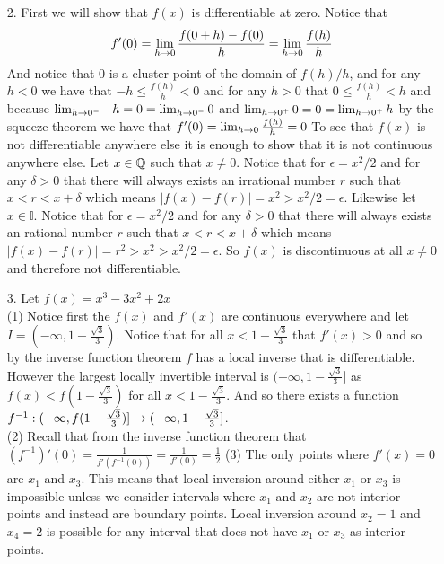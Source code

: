 \documentclass[12pt]{amsart}
\begin{document}
\begin{itemize}
   \item[2.] First we will show that $f(x)$ is differentiable at zero. Notice that
      \[f'(0)=\lim_{h\rightarrow 0}\frac{f(0+h)-f(0)}{h}=\lim_{h\rightarrow 0}\frac{f(h)}{h}\]
      And notice that $0$ is a cluster point of the domain of $f(h)/h$, and for any
      $h<0$ we have that $-h\leq \frac{f(h)}{h}<0$ and for any $h>0$ that $0\leq
         \frac{f(h)}{h}<h$ and because $\lim_{h\rightarrow 0^-}-h=0=\lim_{h\rightarrow 0^-}0$ and
      $\lim_{h\rightarrow 0^+}0=0=\lim_{h\rightarrow 0^+}h$ by the squeeze theorem we have that
      \(f'(0)=\lim_{h\rightarrow 0}\frac{f(h)}{h}=0\) To see that $f(x)$ is not
      differentiable anywhere else it is enough to show that it is not continuous
      anywhere else. Let $x\in \mathbb{Q}$ such that $x\neq 0$. Notice that for
      $\epsilon=x^2/2$ and for any $\delta>0$ that there will always exists an
      irrational number $r$ such that $x<r<x+\delta$ which means
      $|f(x)-f(r)|=x^2>x^2/2=\epsilon$. Likewise let $x\in \mathbb{I}$. Notice that
      for $\epsilon=x^2/2$ and for any $\delta>0$ that there will always exists an
      rational number $r$ such that $x<r<x+\delta$ which means
      $|f(x)-f(r)|=r^2>x^2>x^2/2=\epsilon$. So $f(x)$ is discontinuous at all $x\neq
         0$ and therefore not differentiable.

   \item[3.] Let $f(x)=x^3-3x^2+2x$\\ %
      (1) Notice first the $f(x)$ and $f'(x)$ are continuous everywhere and let 
      $I=(-\infty, 1-\frac{\sqrt{3}}{3})$. Notice that for all $x<1-\frac{\sqrt{3}}{3}$ that $f'(x)>0$ and so
      by the inverse function theorem $f$ has a local inverse that is differentiable. 
      However the largest locally invertible interval is $(-\infty, 1-\frac{\sqrt{3}}{3}]$
      as $f(x)<f(1-\frac{\sqrt{3}}{3})$ for all $x<1-\frac{\sqrt{3}}{3}$. And so there 
      exists a function $f^{-1}:(-\infty,f(1-\frac{\sqrt{3}}{3})]\rightarrow(-\infty,1-\frac{\sqrt{3}}{3}]$.\\
      (2) Recall that from the inverse function theorem that $(f^{-1})'(0)=\frac{1}{f'(f^{-1}(0))}=\frac{1}{f'(0)}=\frac{1}{2}$
      (3) The only points where $f'(x)=0$ are $x_1$ and $x_3$. This means that local 
      inversion around either $x_1$ or $x_3$ is impossible unless we consider intervals where
      $x_1$ and $x_2$ are not interior points and instead are boundary points.
      Local inversion around $x_2=1$ and $x_4=2$ is possible for any interval that does 
      not have $x_1$ or $x_3$ as interior points. %


\end{itemize}
\end{document}
